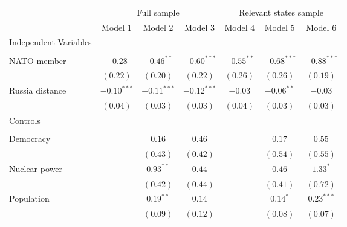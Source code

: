 
\begin{table}[h]
\begin{center}
\begin{tabular}{l c c c c c c}
\hline
 & \multicolumn{3}{c}{Full sample} & \multicolumn{3}{c}{Relevant states sample} \\
\cline{2-4} \cline{5-7}
 & Model 1 & Model 2 & Model 3 & Model 4 & Model 5 & Model 6 \\
\hline
Independent Variables &               &               &               &              &               &               \\
                      &               &               &               &              &               &               \\
\quad NATO member     & $-0.28$       & $-0.46^{**}$  & $-0.60^{***}$ & $-0.55^{**}$ & $-0.68^{***}$ & $-0.88^{***}$ \\
                      & $(0.22)$      & $(0.20)$      & $(0.22)$      & $(0.26)$     & $(0.26)$      & $(0.19)$      \\
\quad Russia distance & $-0.10^{***}$ & $-0.11^{***}$ & $-0.12^{***}$ & $-0.03$      & $-0.06^{**}$  & $-0.03$       \\
                      & $(0.04)$      & $(0.03)$      & $(0.03)$      & $(0.04)$     & $(0.03)$      & $(0.03)$      \\
Controls              &               &               &               &              &               &               \\
                      &               &               &               &              &               &               \\
\quad Democracy       &               & $0.16$        & $0.46$        &              & $0.17$        & $0.55$        \\
                      &               & $(0.43)$      & $(0.42)$      &              & $(0.54)$      & $(0.55)$      \\
\quad Nuclear power   &               & $0.93^{**}$   & $0.44$        &              & $0.46$        & $1.33^{*}$    \\
                      &               & $(0.42)$      & $(0.44)$      &              & $(0.41)$      & $(0.72)$      \\
\quad Population      &               & $0.19^{**}$   & $0.14$        &              & $0.14^{*}$    & $0.23^{***}$  \\
                      &               & $(0.09)$      & $(0.12)$      &              & $(0.08)$      & $(0.07)$      \\

\end{tabular}
\end{center}
\end{table}
